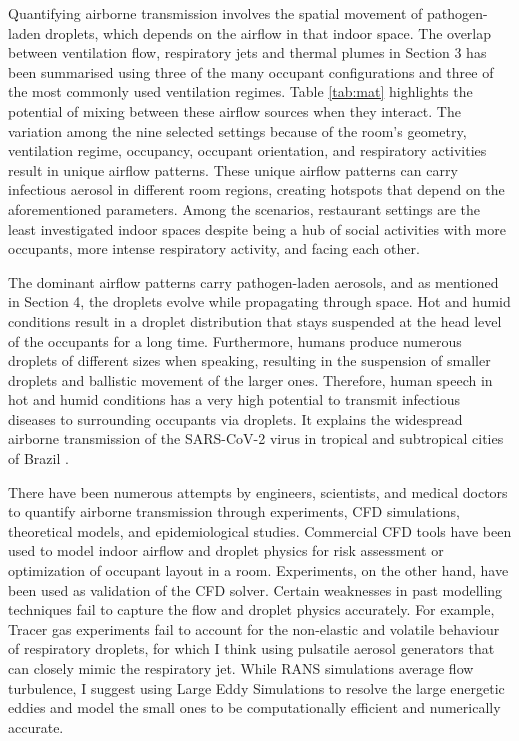 \documentclass[preprint,12pt]{elsarticle}
\begin{document}
Quantifying airborne transmission involves the spatial movement of pathogen-laden droplets, which depends on the airflow in that indoor space. The overlap between ventilation flow, respiratory jets and thermal plumes in Section 3 has been summarised using three of the many occupant configurations and three of the most commonly used ventilation regimes. Table \ref{tab:mat} highlights the potential of mixing between these airflow sources when they interact. The variation among the nine selected settings because of the room's geometry, ventilation regime, occupancy, occupant orientation, and respiratory activities result in unique airflow patterns. These unique airflow patterns can carry infectious aerosol in different room regions, creating hotspots that depend on the aforementioned parameters. Among the scenarios, restaurant settings are the least investigated indoor spaces despite being a hub of social activities with more occupants, more intense respiratory activity, and facing each other.

The dominant airflow patterns carry pathogen-laden aerosols, and as mentioned in Section 4, the droplets evolve while propagating through space. Hot and humid conditions result in a droplet distribution that stays suspended at the head level of the occupants for a long time. Furthermore, humans produce numerous droplets of different sizes when speaking, resulting in the suspension of smaller droplets and ballistic movement of the larger ones. Therefore, human speech in hot and humid conditions has a very high potential to transmit infectious diseases to surrounding occupants via droplets. It explains the widespread airborne transmission of the SARS-CoV-2 virus in tropical and subtropical cities of Brazil \citep{prata2020temperature}. 

There have been numerous attempts by engineers, scientists, and medical doctors to quantify airborne transmission through experiments, CFD simulations, theoretical models, and epidemiological studies. Commercial CFD tools have been used to model indoor airflow and droplet physics for risk assessment or optimization of occupant layout in a room. Experiments, on the other hand, have been used as validation of the CFD solver. Certain weaknesses in past modelling techniques fail to capture the flow and droplet physics accurately. For example, Tracer gas experiments fail to account for the non-elastic and volatile behaviour of respiratory droplets, for which I think using pulsatile aerosol generators that can closely mimic the respiratory jet. While RANS simulations average flow turbulence, I suggest using Large Eddy Simulations to resolve the large energetic eddies and model the small ones to be computationally efficient and numerically accurate.
\end{document}
